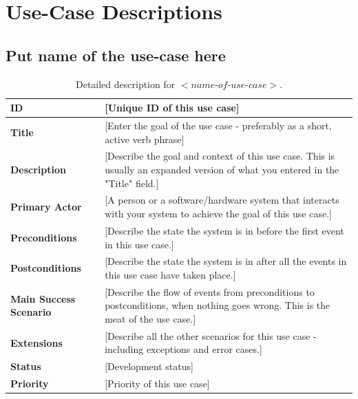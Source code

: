 \documentclass[11pt]{extarticle}
\begin{document}
\newpage
\justify
\section{Use-Case Descriptions}

\subsection{Put name of the use-case here}
\begin{table}[H]
    \begin{center}
        \begin{tabular}{ |m{6cm}|p{6cm}| } 
           \hline
           \textbf{ID} &  [Unique ID of this use case]\\
           \hline
           \textbf{Title} &  [Enter the goal of the use case - preferably as a short, active verb phrase]\\
           \hline
           \textbf{Description} &  [Describe the goal and context of this use case. This is usually an expanded version of what you entered in the "Title" field.]\\
           \hline
           \textbf{Primary Actor} & [A person or a software/hardware system that interacts with your system to achieve the goal of this use case.] \\
           \hline
           \textbf{Preconditions} &  [Describe the state the system is in before the first event in this use case.]\\
           \hline
           \textbf{Postconditions} & [Describe the state the system is in after all the events in this use case have taken place.] \\
           \hline
           \textbf{Main Success Scenario} & [Describe the flow of events from preconditions to postconditions, when nothing goes wrong. This is the meat of the use case.]\\
           \hline
           \textbf{Extensions} &  [Describe all the other scenarios for this use case - including exceptions and error cases.]\\
           \hline
           \textbf{Status} &  [Development status]\\
           \hline
           \textbf{Priority} & [Priority of this use case] \\
           \hline
        \end{tabular}
    \end{center}
    \caption{\label{tab:Table 1} Detailed description for $<\textit{name-of-use-case}>$.}
\end{table}
\end{document}
